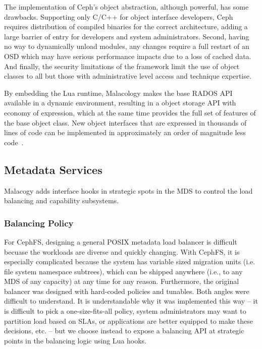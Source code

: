 \documentclass[10pt,twocolumn]{article}
\begin{document}
The implementation of Ceph's object abstraction, although powerful, has some 
drawbacks.
Supporting only C/C++ for object interface developers, Ceph requires
distribution of compiled binaries for the correct architecture, adding a
large barrier of entry for developers and system administrators. Second,
having no way to dynamically unload modules, any changes require a full
restart of an OSD which may have serious performance impacts due to a loss
of cached data. And finally, the security limitations of the framework
limit the use of object classes to all but those with administrative level
access and technique expertise.

By embedding the Lua runtime, Malacology makes the base RADOS API available in a 
dynamic environment, resulting in a object storage API with economy of 
expression, which at the same time provides the full set of features of the base 
object class. New object interfaces that are expressed in thousands of lines of 
code can be implemented in approximately an order of magnitude less 
code~\cite{geambasu_comet_2010}.


\subsection{Metadata Services}


Malacogy adds interface hooks in strategic spots in the MDS to control the load balancing and capability subsystems. 

\subsubsection{Balancing Policy}

For CephFS, designing a general POSIX metadata load balancer is difficult becuase the workloads are diverse and quickly changing. With CephFS, it is especially complicated because the system has variable sized migration units (i.e. file system namespace subtrees), which can be shipped anywhere (i.e., to any MDS of any capacity) at any time for any reason. Furthermore, the original balancer was designed with hard-coded policies and tunables. Both angles were difficult to understand. It is understandable why it was implemented this way -- it is difficult to pick a one-size-fits-all policy, system administrators may want to partition load based on SLAs, or applications are better equipped to make these decisions, etc. -- but we choose instead to expose a balancing API at strategic points in the balancing logic using Lua hooks. 
\end{document}
